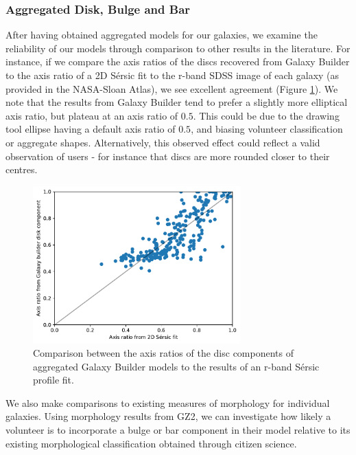 \documentclass[../main.tex]{subfiles}
\begin{document}
\subsubsection{Aggregated Disk, Bulge and Bar}
After having obtained aggregated models for our galaxies, we examine the reliability of our models through comparison to other results in the literature. For instance, if we compare the axis ratios of the discs recovered from Galaxy Builder to the axis ratio of a 2D S\'ersic fit to the r-band SDSS image of each galaxy (as provided in the NASA-Sloan Atlas), we see excellent agreement (Figure \ref{fig:ax_ratio_comparison}). We note that the results from Galaxy Builder tend to prefer a slightly more elliptical axis ratio, but plateau at an axis ratio of $0.5$. This could be due to the drawing tool ellipse having a default axis ratio of $0.5$, and biasing volunteer classification or aggregate shapes. Alternatively, this observed effect could reflect a valid observation of users - for instance that discs are more rounded closer to their centres.


\begin{figure}
  \includegraphics[width=8cm]{images__results/GZBvsNSA_ax-ratio_SERSIC_BA.pdf}
  \caption{Comparison between the axis ratios of the disc components of aggregated Galaxy Builder models to the results of an r-band S\'ersic profile fit.}
  \label{fig:ax_ratio_comparison}
\end{figure}

We also make comparisons to existing measures of morphology for individual galaxies. Using morphology results from GZ2, we can investigate how likely a volunteer is to incorporate a bulge or bar component in their model relative to its existing morphological classification obtained through citizen science.
\end{document}
